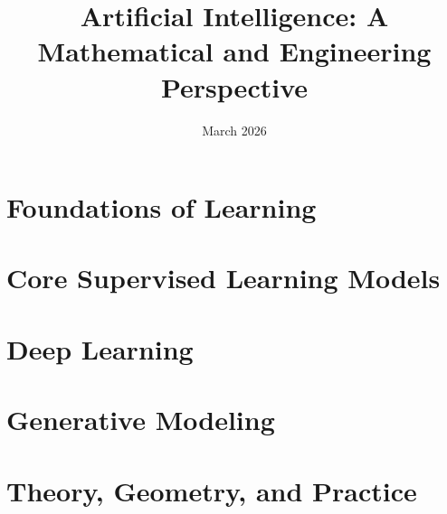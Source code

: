 \documentclass[11pt]{book}
\title{Artificial Intelligence: A Mathematical and Engineering Perspective}
\author{}
\date{March 2026}
\begin{document}
\maketitle

\part{Foundations of Learning}







\part{Core Supervised Learning Models}









\part{Deep Learning}











\part{Generative Modeling}









\part{Theory, Geometry, and Practice}




\end{document}
